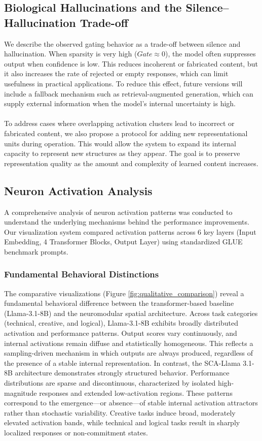 \documentclass[11pt, letterpaper]{article}
\begin{document}
\subsection{Biological Hallucinations and the Silence–Hallucination Trade-off}
We describe the observed gating behavior as a trade-off between silence and hallucination. When sparsity is very high ($Gate \approx 0$), the model often suppresses output when confidence is low. This reduces incoherent or fabricated content, but it also increases the rate of rejected or empty responses, which can limit usefulness in practical applications. To reduce this effect, future versions will include a fallback mechanism such as retrieval-augmented generation, which can supply external information when the model’s internal uncertainty is high.

\paragraph{}
To address cases where overlapping activation clusters lead to incorrect or fabricated content, we also propose a protocol for adding new representational units during operation. This would allow the system to expand its internal capacity to represent new structures as they appear. The goal is to preserve representation quality as the amount and complexity of learned content increases.

\subsection{Neuron Activation Analysis}
A comprehensive analysis of neuron activation patterns was conducted to 
understand the underlying mechanisms behind the performance improvements.
Our visualization system compared activation patterns across 6 key layers (Input Embedding, 4 Transformer Blocks, Output Layer) using standardized GLUE benchmark prompts.

\subsubsection{Fundamental Behavioral Distinctions}
The comparative visualizations (Figure \ref{fig:qualitative_comparison}) reveal a fundamental behavioral difference between the transformer-based baseline (Llama-3.1-8B) and the neuromodular spatial architecture. Across task categories (technical, creative, and logical), Llama-3.1-8B exhibits broadly distributed activation and performance patterns. Output scores vary continuously, and internal activations remain diffuse and statistically homogeneous. This reflects a sampling-driven mechanism in which outputs are always produced, regardless of the presence of a stable internal representation. In contrast, the SCA-Llama 3.1-8B architecture demonstrates strongly structured behavior. Performance distributions are sparse and discontinuous, characterized by isolated high-magnitude responses and extended low-activation regions. These patterns correspond to the emergence—or absence—of stable internal activation attractors rather than stochastic variability. Creative tasks induce broad, moderately elevated activation bands, while technical and logical tasks result in sharply localized responses or non-commitment states.
\end{document}

